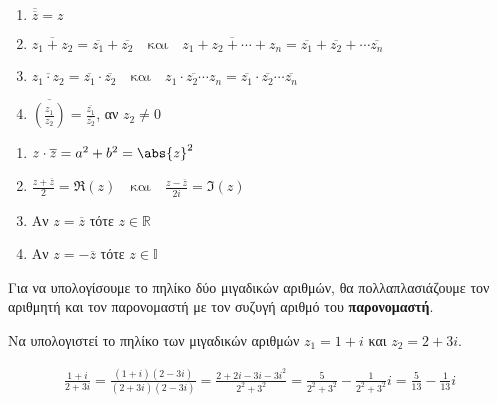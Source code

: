 \documentclass[a4paper,table]{report}
\newcommand{\twocolumnsidell}[2]{\begin{minipage}[t]{0.55\linewidth}\raggedright
    #1
    \end{minipage}\hfill\begin{minipage}[t]{0.40\linewidth}\raggedright
    #2
  \end{minipage}
}
\begin{document}
\twocolumnsidell{
  \begin{enumerate}
    \item $ \overline{\overline{z}} = z $
    \item $ \overline{z_{1}+ z_{2}} = \overline{z_{1}} + \overline{z_{2}} \quad
      \text{και} \quad 
      \overline{z_{1}+ z_{2}+ \cdots + z_{n}} = \overline{z_{1}} + \overline{z_{2}} +
      \cdots \overline{z_{n}} $
    \item $ \overline{z_{1}\cdot z_{2}} = \overline{z_{1}} \cdot \overline{z_{2}} \quad
      \text{και} \quad 
      \overline{z_{1}\cdot z_{2} \cdots z_{n}} = \overline{z_{1}} \cdot
      \overline{z_{2}} \cdots \overline{z_{n}} $
    \item $ \overline{\left(\frac{z_{1}}{z_{2}}\right)} =
      \frac{\overline{z_{1}}}{\overline{z_{2}}} $, αν $ z_{2} \neq 0 $
  \end{enumerate}
}{
  \begin{enumerate}[start=5]
    \item $ z \cdot \overline{z} = a^{2}+b^{2} = \abs{z} ^{2} $
    \item $ \frac{z+ \overline{z}}{2} = \Re(z) \quad \text{και} \quad 
      \frac{z- \overline{z}}{2i} = \Im(z) $ 
    \item Αν $ z = \overline{z} $ τότε $ z \in \mathbb{R} $
    \item Αν $ z = -\overline{z} $ τότε $ z \in \mathbb{I} $
  \end{enumerate}
}

\begin{rem}
  Για να υπολογίσουμε το πηλίκο δύο μιγαδικών αριθμών, θα πολλαπλασιάζουμε τον αριθμητή
  και τον παρονομαστή με τον συζυγή αριθμό του \textbf{παρονομαστή}.
\end{rem}
\begin{example} 
  Να υπολογιστεί το πηλίκο των μιγαδικών αριθμών $ z_{1}=1+i $ και $ z_{2}=2+3i $.
\end{example}
\begin{solution}
  \begin{align*}
    \frac{1+i}{2+3i} = \frac{(1+i)(2-3i)}{(2+3i)(2-3i)} =
    \frac{2+2i-3i-3i^{2}}{2^{2}+3^{2}} = \frac{5}{2^{2}+3^{2}} - 
    \frac{1}{2^{2}+3^{2}}i = \frac{5}{13} - \frac{1}{13} i
  \end{align*}
\end{solution}


\vspace{\baselineskip}
\end{document}
